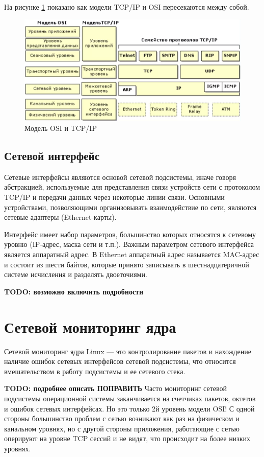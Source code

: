 \clearpage

На рисунке \ref{img:protocol} показано как модели  TCP/IP и OSI пересекаются между собой.
\begin{figure}[h!]
	\centering
	\includegraphics[height=0.3\textheight]{img/protocol}
	\caption{Модель OSI и TCP/IP}
	\label{img:protocol}
\end{figure}

\subsection{Сетевой интерфейс}

Сетевые интерфейсы являются основой сетевой подсистемы, иначе говоря абстракцией, используемые для представления связи устройств сети с протоколом TCP/IP и передачи данных через некоторые линии связи.
Основными устройствами, позволяющими организовывать взаимодействие по сети, являются сетевые адаптеры (Ethernet-карты).

Интерфейс имеет набор параметров, большинство которых относятся к сетевому уровню (IP-адрес, маска сети и т.п.).
Важным параметром сетевого интерфейса является аппаратный адрес. 
В Ethernet аппаратный адрес называется MAC-адрес и состоит из шести байтов, которые принято записывать в шестнадцатеричной системе исчисления и разделять двоеточиями.

\textbf{TODO: возможно включить подробности}

\section{Сетевой мониторинг ядра}

Сетевой мониторинг ядра Linux --- это контролирование пакетов и нахождение наличие ошибок сетевых интерфейсов сетевой подсистемы, что относится вмешательством в работу подсистемы и ее сетевого стека.

\textbf{TODO: подробнее описать ПОПРАВИТЬ}
Часто мониторинг сетевой подсистемы операционной системы заканчивается на счетчиках пакетов, октетов и ошибок сетевых интерфейсах. Но это только 2й уровень модели OSI!
С одной стороны большинство проблем с сетью возникают как раз на физическом и канальном уровнях, но с другой стороны приложения, работающие с сетью оперируют на уровне TCP сессий и не видят, что происходит на более низких уровнях.

